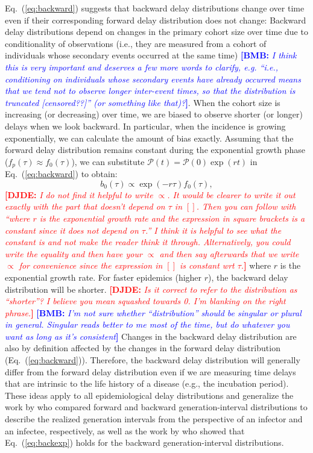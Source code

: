 \documentclass[12pt]{article}
\newcommand{\comment}{\showcomment}
\newcommand{\showcomment}[3]{\textcolor{#1}{\textbf{[#2: }\textsl{#3}\textbf{]}}}
\newcommand{\bmb}[1]{\comment{blue}{BMB}{#1}}
\newcommand{\djde}[1]{\comment{red}{DJDE}{#1}}
\newcommand{\eref}[1]{Eq.~(\ref{eq:#1})}
\newcommand{\psize}{{\mathcal P}} %
\begin{document}
\eref{backward} suggests that backward delay distributions change over time even if their corresponding forward delay distribution does not change:
Backward delay distributions depend on changes in the primary cohort size over time due to conditionality of observations (i.e., they are measured from a cohort of individuals whose secondary events occurred at the same time) \bmb{I think this is very important and deserves a few more words to clarify, e.g. ``i.e., conditioning on individuals whose secondary events have already occurred means that we tend not to observe longer inter-event times, so that the distribution is truncated [censored??]'' (or something like that)?}.
When the cohort size is increasing (or decreasing) over time, we are biased to observe shorter (or longer) delays when we look backward.
In particular, when the incidence is growing exponentially, we can calculate the amount of bias exactly.
Assuming that the forward delay distribution remains constant during the exponential growth phase ($f_p(\tau) \approx f_0(\tau)$), we can substitute $\psize(t) = \psize(0) \exp(rt)$ in \eref{backward} to obtain:
\begin{equation}
b_0(\tau) \propto \exp(-r\tau) f_0(\tau),
\label{eq:backexp}
\end{equation}
\djde{I do not find it helpful to write $\propto$.  It would be clearer to write it out exactly with the part that doesn't depend on $\tau$ in $[]$.  Then you can follow with ``where $r$ is the exponential growth rate and the expression in square brackets is a constant since it does not depend on $\tau$.''  I think it is helpful to see what the constant is and not make the reader think it through.  Alternatively, you could write the equality and then have your $\propto$ and then say afterwards that we write $\propto$ for convenience since the expression in $[]$ is constant wrt $\tau$.}
where $r$ is the exponential growth rate.
For faster epidemics (higher $r$), the backward delay distribution will be shorter.
\djde{Is it correct to refer to the distribution as ``shorter''?  I
  believe you mean squashed towards 0.  I'm blanking on the right phrase.}
\bmb{I'm not sure whether ``distribution'' should be singular or plural in general.  Singular reads better to me most of the time, but do whatever you want as long as it's consistent}
Changes in the backward delay distribution are also by definition affected by the changes in the forward delay distribution (\eref{backward}).
Therefore, the backward delay distribution will generally differ from the forward delay distribution even if we are measuring time delays that are intrinsic to the life history of a disease (e.g., the incubation period).
These ideas apply to all epidemiological delay distributions and generalize the work by \cite{champredon2015intrinsic} who compared forward and backward generation-interval distributions to describe the realized generation intervals from the perspective of an infector and an infectee, respectively, as well as the work by \cite{britton2019estimation} who showed that \eref{backexp} holds for the backward generation-interval distributions.
\end{document}
